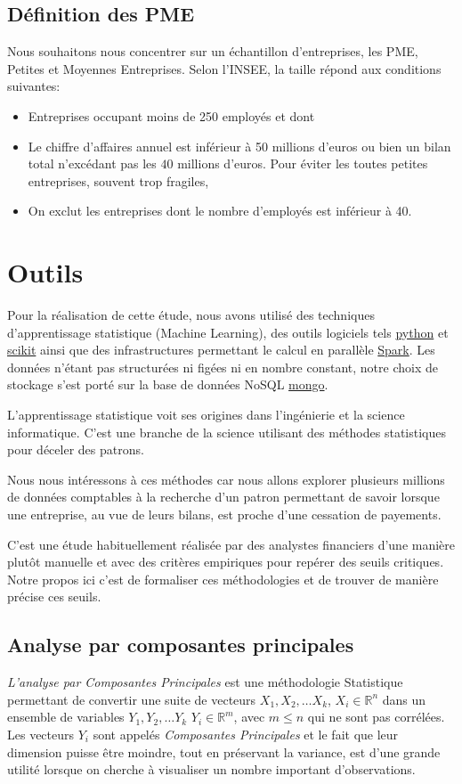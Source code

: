 \documentclass[DIV=calc, paper=a4, fontsize=11pt, twocolumn]{scrartcl}
\begin{document}
\subsection{Définition des PME}
Nous souhaitons nous concentrer sur un échantillon d'entreprises, les PME, Petites et Moyennes Entreprises. Selon l'INSEE, la taille répond aux conditions suivantes:
\begin{itemize}
    \item Entreprises occupant moins de 250 employés et dont
    \item Le chiffre d'affaires annuel est inférieur à 50 millions d'euros ou bien un bilan total n'excédant pas les $40$ millions d'euros. Pour éviter les toutes petites entreprises, souvent trop fragiles, 
    \item On exclut les entreprises dont le nombre d'employés est inférieur à 40.
\end{itemize}

\section{Outils}
Pour la réalisation de cette étude, nous avons utilisé des techniques d'apprentissage statistique (Machine Learning), des outils logiciels tels \href{https://www.python.org/}{python} et \href{http://scikit-learn.org/stable/}{scikit} ainsi que des infrastructures permettant le calcul en parallèle \href{http://spark.apache.org/}{Spark}. Les données n'étant pas structurées ni figées ni en nombre constant, notre choix de stockage s'est porté sur la base de données NoSQL \href{https://www.mongodb.com/}{mongo}.

L'apprentissage statistique voit ses origines dans l'ingénierie et la science informatique. C'est une branche de la science utilisant 
des méthodes statistiques pour déceler des patrons. 

Nous nous intéressons à ces méthodes car nous allons explorer plusieurs millions de données comptables à la recherche d'un patron permettant de savoir lorsque une entreprise, au vue de leurs bilans, est proche d'une cessation de payements. 

C'est une étude habituellement réalisée par des analystes financiers d'une manière plutôt manuelle et avec des critères empiriques pour repérer des seuils critiques. Notre propos ici c'est de formaliser ces méthodologies et de trouver de manière précise ces seuils.

\subsection{Analyse par composantes principales}
\emph{L'analyse par Composantes Principales} est une méthodologie Statistique permettant de convertir une suite de vecteurs $X_1, X_2, \ldots X_k$, $X_i \in \mathbb{R}^n$ dans un ensemble de variables $Y_1, Y_2, \ldots Y_k$ $Y_i \in \mathbb{R}^m$, avec $m \leq n$ qui ne sont pas corrélées. Les vecteurs $Y_i$ sont appelés \emph{Composantes Principales} et le fait que leur dimension puisse être moindre, tout en préservant la variance, est d'une grande utilité lorsque on cherche à visualiser un nombre important d'observations. 
\end{document}
